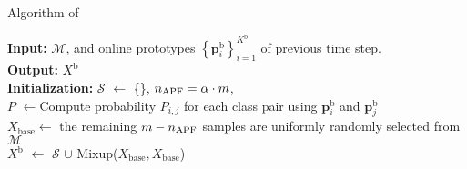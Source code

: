 \begin{algorithm*}
    \caption{Algorithm of \dataaugname}
    \label{alg_aug}
    \textbf{Input:}\hspace{0mm} $\mathcal{M}$, and online prototypes $\left\{ \mathbf{p}_i^\mathrm{b} \right\} ^{K^\mathrm{b}}_{i=1}$ of previous time step.\\
    \textbf{Output:}\hspace{0mm} $X^\mathrm{b}$\\
    \textbf{Initialization:} $\mathcal{S}$ $\gets$ \{\}, $n_{\mathrm{APF}} = \alpha \cdot m$,\\
    $P$ $\gets$Compute probability $P_{i, j}$ for each class pair using $\mathbf{p}_i^\mathrm{b}$ and $\mathbf{p}_j^\mathrm{b}$ \\
    $X_{\mathrm{base}} \gets$ the remaining $m-n_{\mathrm{APF}}$ samples are uniformly randomly selected from $\mathcal{M}$ \\
    $X^\mathrm{b}$ $\gets$ $\mathcal{S}$ $\cup$ Mixup($X_{\mathrm{base}}, X_{\mathrm{base}}$)
    
\end{algorithm*}